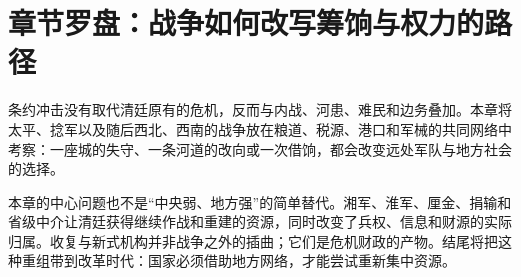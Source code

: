 \section{章节罗盘：战争如何改写筹饷与权力的路径}
\label{sec:nineteenth-conflicts-compass}

条约冲击没有取代清廷原有的危机，反而与内战、河患、难民和边务叠加。本章将太平、捻军以及随后西北、西南的战争放在粮道、税源、港口和军械的共同网络中考察：一座城的失守、一条河道的改向或一次借饷，都会改变远处军队与地方社会的选择。

本章的中心问题也不是“中央弱、地方强”的简单替代。湘军、淮军、厘金、捐输和省级中介让清廷获得继续作战和重建的资源，同时改变了兵权、信息和财源的实际归属。收复与新式机构并非战争之外的插曲；它们是危机财政的产物。结尾将把这种重组带到改革时代：国家必须借助地方网络，才能尝试重新集中资源。
